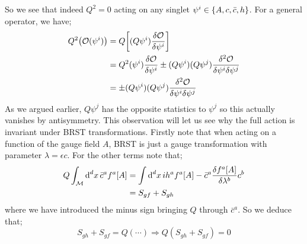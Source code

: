 So we see that indeed $Q^2 = 0$ acting on any singlet $\psi^i \in \set{A, c, \bar{c}, h}$. For a general operator, we have;
\begin{align*}
Q^2\left(\mO(\psi^i)\right) &= Q\left[(Q\psi^i)\frac{\delta \mO}{\delta \psi^i}\right] \\
&= Q^2( \psi^i )\frac{\delta \mO}{\delta \psi^i} \pm (Q\psi^i)(Q\psi^j)\frac{\delta^2 \mO}{\delta \psi^i \delta \psi^j} \\
&= \pm (Q\psi^i)(Q\psi^j)\frac{\delta^2 \mO}{\delta \psi^i \delta \psi^j}
\end{align*}
As we argued earlier, $Q\psi^j$ has the opposite statistics to $\psi^j$ so this actually vanishes by antisymmetry. This observation will let us see why the full action is invariant under BRST transformations. Firstly note that when acting on a function of the gauge field $A$, BRST is just a gauge transformation with parameter $\lambda = \epsilon c$. For the other terms note that;
\begin{align*}
Q\int_{\mathcal{M}}{\text{d}^d x \,\bar{c}^a f^a[A]} &= \int{\text{d}^d x \,ih^a f^a[A] - \bar{c}^a \frac{\delta f^a[A]}{\delta \lambda^b}c^b} \\
&= S_{gf} + S_{gh}
\end{align*}
where we have introduced the minus sign bringing $Q$ through $\bar{c}^a$. So we deduce that;
\begin{equation*}
S_{gh} + S_{gf} = Q(\cdots) \Rightarrow Q\left(S_{gh} + S_{gf}\right) = 0
\end{equation*}

